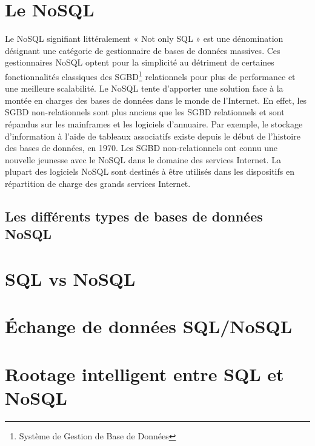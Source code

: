 \section{Le NoSQL}

Le NoSQL signifiant littéralement « \textsf{Not only SQL} » est une
dénomination désignant une catégorie de gestionnaire de bases de
données massives. Ces gestionnaires \textsf{NoSQL} optent pour la
simplicité au détriment de certaines fonctionnalités classiques des
\textsf{SGBD}\footnote{Système de Gestion de Base de Données}
relationnels pour plus de performance et une meilleure scalabilité.
Le \textsf{NoSQL} tente d'apporter une solution face à la montée en
charges des bases de données dans le monde de l'\textsf{Internet}. En
effet, les \textsf{SGBD} non-relationnels sont plus anciens que les
\textsf{SGBD} relationnels et sont répandus sur les mainframes et les
logiciels d'annuaire. Par exemple, le stockage d'information à l'aide
de tableaux associatifs existe depuis le début de
l'histoire des bases de données, en 1970. 
Les \textsf{SGBD} non-relationnels ont connu une nouvelle jeunesse avec le
\textsf{NoSQL} dans le domaine des services \textsf{Internet}. La
plupart des logiciels \textsf{NoSQL} sont destinés à être utilisés
dans les dispositifs en répartition de charge des grands services
\textsf{Internet}.

\subsection{Les différents types de bases de données \textsf{NoSQL}} 

\section{SQL vs NoSQL}

\section{Échange de données SQL/NoSQL}

\section{Rootage intelligent entre SQL et NoSQL}

